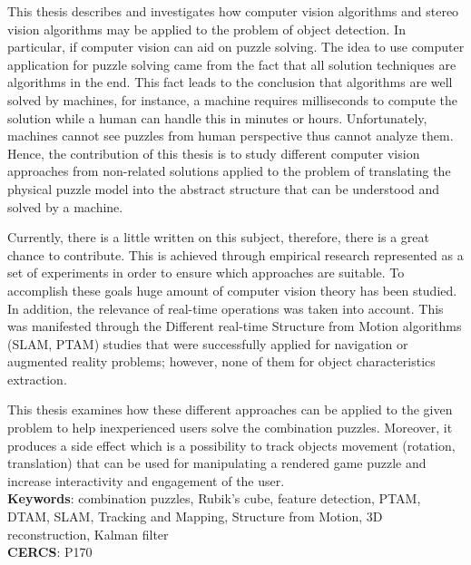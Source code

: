 \documentclass[../main]{subfiles}
\begin{document}
This thesis describes and investigates how computer vision algorithms and stereo vision algorithms may be applied to the problem of object detection. In particular, if computer vision can aid on puzzle solving. The idea to use computer application for puzzle solving came from the fact that all solution techniques are algorithms in the end. This fact leads to the conclusion that algorithms are well solved by machines, for instance, a machine requires milliseconds to compute the solution while a human can handle this in minutes or hours. Unfortunately, machines cannot see puzzles from human perspective thus cannot analyze them. Hence, the contribution of this thesis is to study different computer vision approaches from non-related solutions applied to the problem of translating the physical puzzle model into the abstract structure that can be understood and solved by a machine.

Currently, there is a little written on this subject, therefore, there is a great chance to contribute. This is achieved through empirical research represented as a set of experiments in order to ensure which approaches are suitable. To accomplish these goals huge amount of computer vision theory has been studied. In addition, the relevance of real-time operations was taken into account. This was manifested through the Different real-time Structure from Motion algorithms (SLAM, PTAM) studies that were successfully applied for navigation or augmented reality problems; however, none of them for object characteristics extraction.

This thesis examines how these different approaches can be applied to the given problem to help inexperienced users solve the combination puzzles. Moreover, it produces a side effect which is a possibility to track objects movement (rotation, translation) that can be used for manipulating a rendered game puzzle and increase interactivity and engagement of the user. \vspace{5mm} \\ \textbf{Keywords}: combination puzzles, Rubik's cube, feature detection, PTAM, DTAM, SLAM, Tracking and Mapping, Structure from Motion, 3D reconstruction, Kalman filter \\
\textbf{CERCS}: P170
\end{document}
